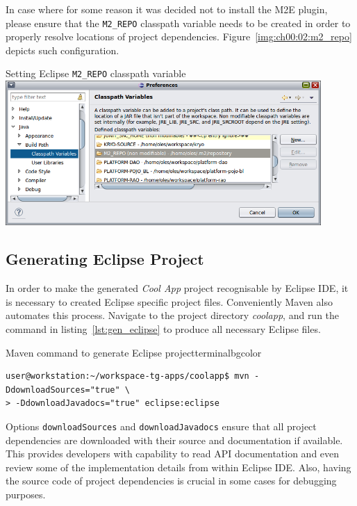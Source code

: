   In case where for some reason it was decided not to install the M2E plugin, please ensure that the \texttt{M2\_REPO} classpath variable needs to be created in order to properly resolve locations of project dependencies. 
  Figure~\ref{img:ch00:02:m2_repo} depicts such configuration.

  \begin{image}{Setting Eclipse \texttt{M2\_REPO} classpath variable}{\label{img:ch00:02:m2_repo}}    
    \includegraphics[width=0.9\textwidth]{parts/00-part/chapters/01-application-modules/images/06-eclipse-m2-variable.png}
  \end{image}

\subsection{Generating Eclipse Project}

  In order to make the generated \emph{Cool App} project recognisable by Eclipse IDE, it is necessary to created Eclipse specific project files.
  Conveniently Maven also automates this process.
  Navigate to the project directory \emph{coolapp}, and run the command in listing~\ref{lst:gen_eclipse} to produce all necessary Eclipse files.
  
  \begin{code}{Maven command to generate Eclipse project}{\label{lst:gen_eclipse}}{terminalbgcolor}
     \begin{lstlisting}
user@workstation:~/workspace-tg-apps/coolapp$ mvn -DdownloadSources="true" \
> -DdownloadJavadocs="true" eclipse:eclipse
     \end{lstlisting}
  \end{code}
    
  Options \texttt{downloadSources} and \texttt{downloadJavadocs} ensure that all project dependencies are downloaded with their source and documentation if available.
  This provides developers with capability to read API documentation and even review some of the implementation details from within Eclipse IDE.
  Also, having the source code of project dependencies is crucial in some cases for debugging purposes.

